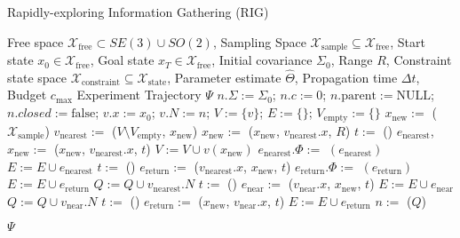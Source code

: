 \documentclass[10pt,a4paper]{article}
\begin{document}
\begin{algorithm}
\caption{Rapidly-exploring Information Gathering (RIG)}
\begin{algorithmic}[1]
\Require Free space $\mathcal{X}_{\mathrm{free}} \subset SE(3) \cup SO(2)$, Sampling Space $\mathcal{X}_{\mathrm{sample}} \subseteq \mathcal{X}_{\mathrm{free}}$, Start state $x_0 \in \mathcal{X}_{\mathrm{free}}$, Goal state $x_T \in \mathcal{X}_{\mathrm{free}}$, Initial covariance $\Sigma_0$, Range $R$, Constraint state space  $\mathcal{X}_{\mathrm{constraint}} \subseteq \mathcal{X}_{\mathrm{state}}$, Parameter estimate $\hat\Theta$, Propagation time $\Delta t$, Budget $c_{\mathrm{max}}$
\Ensure  Experiment Trajectory $\Psi$
\State $n.\Sigma := \Sigma_0$; $n.c := 0$; $n.\mathrm{parent}:=\mathrm{NULL}$; $n.closed := \mathrm{false} $;
\State $v.x := x_0$; $v.N := {n}$;
\State $V := \{v\}$; $E:= \{\}$; $V_{\mathrm{empty}} := \{\}$
\State $x_{\mathrm{new}} := $ ($\mathcal{X}_{\mathrm{sample}}$)
\State $v_{\mathrm{nearest}} := $ ($V \setminus V_{\mathrm{empty}}$, $x_{\mathrm{new}}$)
\State $x_{\mathrm{new}} := $ ($x_{\mathrm{new}}$, $v_{\mathrm{nearest}}.x$, $R$)
\State $t := $ ()
\State $e_{\mathrm{nearest}}$, $x_{\mathrm{new}} := $ ($x_{\mathrm{new}}$, $v_{\mathrm{nearest}}.x$, $t$)
\State $V := V \cup v(x_{\mathrm{new}})$
\State $e_{\mathrm{nearest}}.\Phi :=$ $(e_{\mathrm{nearest}})$
\State $E := E \cup e_{\mathrm{nearest}}$
\State $t := $ ()
\State $e_{\mathrm{return}} := $ ($v_{\mathrm{nearest}}.x$, $x_{\mathrm{new}}$, $t$)
\State $e_{\mathrm{return}}.\Phi :=$ $(e_{\mathrm{return}})$
\State $E := E \cup e_{\mathrm{return}}$
\EndIf
\State $Q := Q \cup v_{\mathrm{nearest}}.N$
\State $t := $ ()
\State $e_{\mathrm{near}} := $ ($v_{\mathrm{near}}.x$, $x_{\mathrm{new}}$, $t$)
\State $E := E \cup e_{\mathrm{near}}$
\State $Q := Q \cup v_{\mathrm{near}}.N$
\EndIf
\State $t := $ ()
\State $e_{\mathrm{return}} := $ ($x_{\mathrm{new}}$, $v_{\mathrm{near}}.x$, $t$)
\State $E := E \cup e_{\mathrm{return}}$
\EndIf
\EndFor
{}
\State $n := $ ($Q$)

\EndWhile
\EndIf
\EndWhile
\State \Return $\Psi$ 
\end{algorithmic} 
\end{algorithm}



\printbibliography
\end{document}
